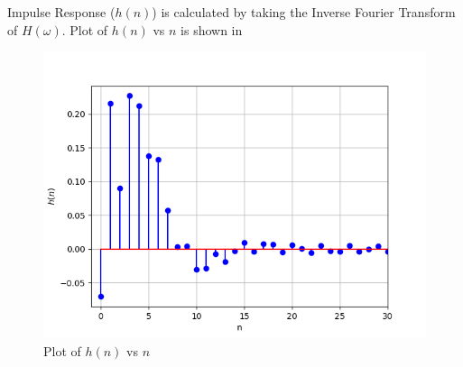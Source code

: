 \documentclass[journal,12pt,twocolumn]{IEEEtran}
\theoremstyle{remark}
\begin{document}
\newpage
Impulse Response ($h(n)$) is calculated by taking the Inverse Fourier Transform of $H(\omega)$.
Plot of $h(n)$ vs $n$ is shown in 
\begin{figure}[!h]
    \centering
    \includegraphics[width = \columnwidth]{figs/h_n.png}
    \caption{Plot of $h(n)$ vs $n$}
    \label{fig:h_n_plot}
\end{figure}
\end{document}

